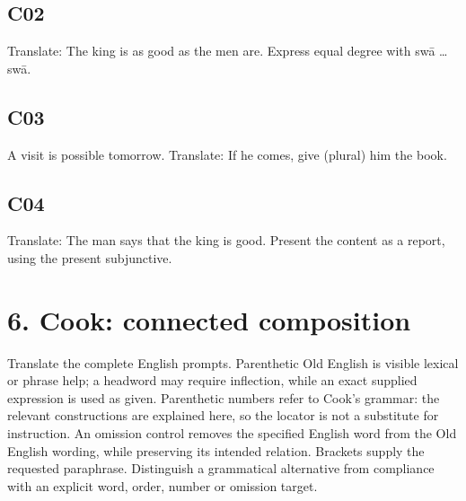 
\subsection*{C02}

Translate: The king is as good as the men are. Express equal degree with swā … swā.


\subsection*{C03}

A visit is possible tomorrow. Translate: If he comes, give (plural) him the book.


\subsection*{C04}

Translate: The man says that the king is good. Present the content as a report, using the present subjunctive.


\section*{6. Cook: connected composition}

Translate the complete English prompts. Parenthetic Old English is visible lexical or phrase help; a headword may require inflection, while an exact supplied expression is used as given. Parenthetic numbers refer to Cook’s grammar: the relevant constructions are explained here, so the locator is not a substitute for instruction. An omission control removes the specified English word from the Old English wording, while preserving its intended relation. Brackets supply the requested paraphrase. Distinguish a grammatical alternative from compliance with an explicit word, order, number or omission target.

